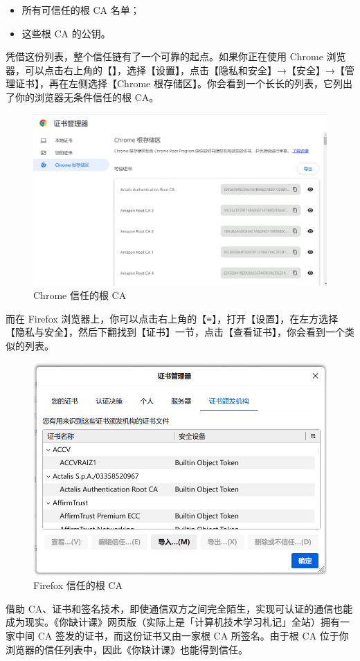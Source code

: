 \begin{itemize}
  \item 所有可信任的根 CA 名单；
  \item 这些根 CA 的公钥。
\end{itemize}

凭借这份列表，整个信任链有了一个可靠的起点。如果你正在使用 Chrome 浏览器，可以点击右上角的【】，选择【设置】，点击【隐私和安全】→【安全】→【管理证书】，再在左侧选择【Chrome 根存储区】。你会看到一个长长的列表，它列出了你的浏览器无条件信任的根 CA。

\begin{figure}[htb!]
  \centering
  \includegraphics[width=.65\textwidth]{assets/surpass/Chrome_Root_CAs.png}
  \caption{Chrome 信任的根 CA}
  \label{fig:Chrome_Root_CAs}
\end{figure}

而在 Firefox 浏览器上，你可以点击右上角的【≡】，打开【设置】，在左方选择【隐私与安全】，然后下翻找到【证书】一节，点击【查看证书】，你会看到一个类似的列表。

\begin{figure}[htb!]
  \centering
  \includegraphics[width=.5\textwidth]{assets/surpass/Firefox_Root_CAs.png}
  \caption{Firefox 信任的根 CA}
  \label{fig:Firefox_Root_CAs}
\end{figure}

借助 CA、证书和签名技术，即使通信双方之间完全陌生，实现可认证的通信也能成为现实。《你缺计课》网页版（实际上是「计算机技术学习札记」全站）拥有一家中间 CA 签发的证书，而这份证书又由一家根 CA 所签名。由于根 CA 位于你浏览器的信任列表中，因此《你缺计课》也能得到信任。

